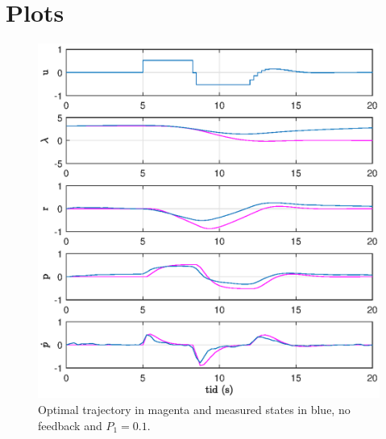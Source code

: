 \appendix

\section{Plots}\label{sec:plots}

\begin{figure}[h]
	\centering
	\includegraphics[width=\textwidth]{figures/plots/2_P1=01.eps}
	\caption{Optimal trajectory in magenta and measured states in blue, no feedback and $P_1=0.1$.}
\label{fig:2_p1=0.1}
\end{figure}

